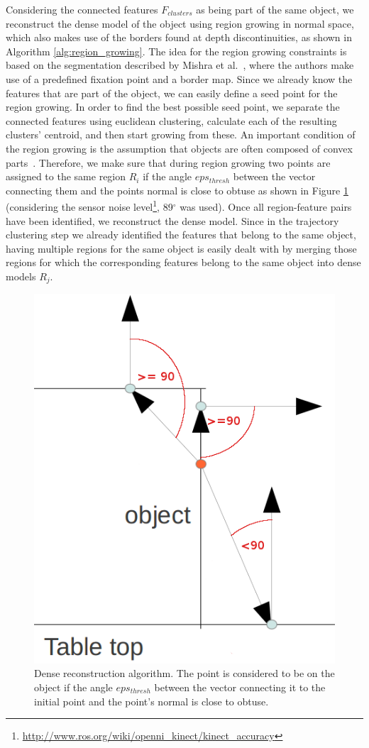 Considering the connected features $F_{clusters}$ as being part of the same object, we reconstruct 
the dense model of the object using region growing in normal space, which also makes use of the 
borders found at depth discontinuities, as shown in Algorithm \ref{alg:region_growing}. 
The idea for the region growing 
constraints is based on the segmentation described by Mishra et al.~\cite{asICCV2009}, 
where the authors make use of a predefined fixation point and a border map. Since we already 
know the features that are part of the object, we can easily define a seed point for the
region growing. In order to find the best possible seed point, we separate the connected 
features using euclidean clustering, calculate each of the resulting clusters' centroid, and 
then start growing from these. An important condition of the region growing is the 
assumption that objects are often composed of convex parts~\cite{Pogor}.
Therefore, we make sure that during region growing two points are assigned to the same region $R_{i}$
if the angle $eps_{thresh}$ between the vector connecting them and the points normal is close to obtuse as shown in Figure \ref{fig:dense}
(considering the sensor noise level\footnote{\url{http://www.ros.org/wiki/openni_kinect/kinect_accuracy}}, 89$^\circ$ was used).
Once all region-feature pairs have been identified, we reconstruct the dense model.
Since in the trajectory clustering step we already identified the features that belong to the same object,
having multiple regions for the same object is easily dealt with
by merging those regions for which the corresponding features belong to the same object into dense models $R_{j}$.

\begin{figure}[ht!]
  \centering \includegraphics[width=0.5\columnwidth]{figures/dense.png}
  \vspace{2ex}
  \caption{Dense reconstruction algorithm. The point is considered to be on the object if the angle $eps_{thresh}$ between the vector connecting it to the initial point and the point's normal is close to obtuse. 
  }
  \label{fig:dense}
\end{figure}

